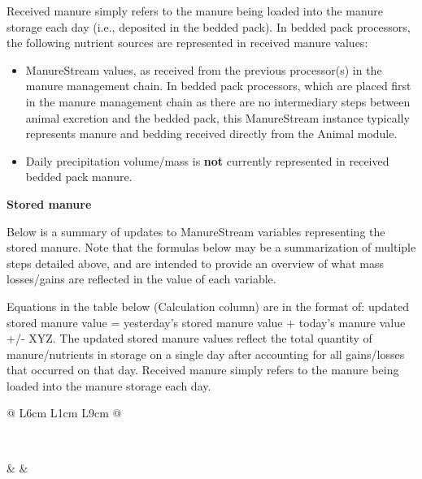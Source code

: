 \begin{refsection}
Received manure simply refers to the manure being loaded into the manure storage each day 
(i.e., deposited in the bedded pack). In bedded pack processors, the following nutrient sources are represented in received manure values:

\begin{itemize}
    \item ManureStream values, as received from the previous processor(s) in the manure management chain. In bedded pack processors, which are placed first in the manure management chain as there are no intermediary steps between animal excretion and the bedded pack, this ManureStream instance typically represents manure and bedding received directly from the Animal module.
    \item Daily precipitation volume/mass is \textbf{not} currently represented in received bedded pack manure.
\end{itemize}
\vspace{0.5cm}

\textbf{Stored manure}
\vspace{ 0.25cm}

Below is a summary of updates to ManureStream variables representing the stored manure. Note that the formulas below may be a summarization of multiple steps detailed above, and are intended to provide an overview of what mass losses/gains are reflected in the value of each variable.
\vspace{0.2cm}

Equations in the table below (Calculation column) are in the format of: updated stored manure value = yesterday’s stored manure value + today’s manure value +/- XYZ. The updated stored manure values reflect the total quantity of manure/nutrients in storage on a single day after accounting for all gains/losses that occurred on that day. Received manure simply refers to the manure being loaded into the manure storage each day. 
\vspace{0.5cm}



\renewcommand{\arraystretch}{1.3}
\begin{longtable}{@{} L{6cm} L{1cm} L{9cm} @{}}
\caption{Calculated manure storage variables and their units} \\
\toprule

 &
 &
 \\

\midrule
\endfirsthead


\end{longtable}
\end{refsection}

